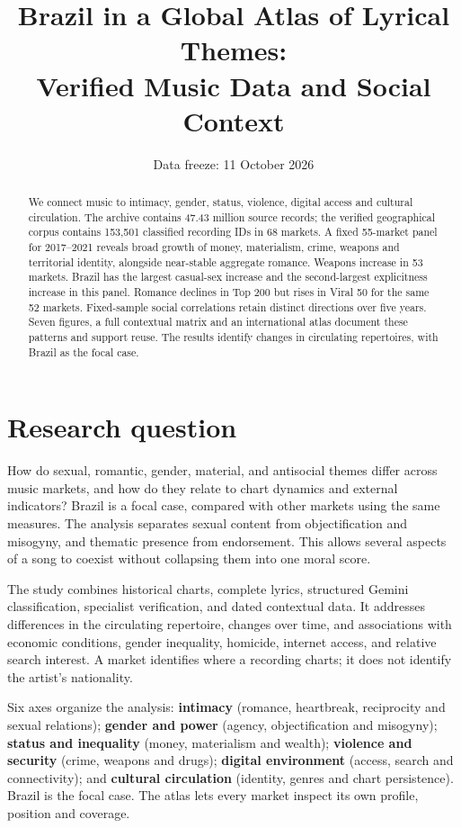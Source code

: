 \documentclass[10pt,a4paper,twocolumn]{article}
\title{\vspace{-8mm}\Large\bfseries Brazil in a Global Atlas of Lyrical Themes:\\Verified Music Data and Social Context}
\author{}
\date{\vspace{-10mm}\small Data freeze: 11 October 2026}
\begin{document}
\raggedbottom
\maketitle
\begin{abstract}
\noindent We connect music to intimacy, gender, status, violence, digital access and cultural circulation. The archive contains 47.43 million source records; the verified geographical corpus contains 153,501 classified recording IDs in 68 markets. A fixed 55-market panel for 2017--2021 reveals broad growth of money, materialism, crime, weapons and territorial identity, alongside near-stable aggregate romance. Weapons increase in 53 markets. Brazil has the largest casual-sex increase and the second-largest explicitness increase in this panel. Romance declines in Top 200 but rises in Viral 50 for the same 52 markets. Fixed-sample social correlations retain distinct directions over five years. Seven figures, a full contextual matrix and an international atlas document these patterns and support reuse. The results identify changes in circulating repertoires, with Brazil as the focal case.
\end{abstract}

\section{Research question}
How do sexual, romantic, gender, material, and antisocial themes differ across music markets, and how do they relate to chart dynamics and external indicators? Brazil is a focal case, compared with other markets using the same measures. The analysis separates sexual content from objectification and misogyny, and thematic presence from endorsement. This allows several aspects of a song to coexist without collapsing them into one moral score.

The study combines historical charts, complete lyrics, structured Gemini classification, specialist verification, and dated contextual data. It addresses differences in the circulating repertoire, changes over time, and associations with economic conditions, gender inequality, homicide, internet access, and relative search interest. A market identifies where a recording charts; it does not identify the artist's nationality.

Six axes organize the analysis: \textbf{intimacy} (romance, heartbreak, reciprocity and sexual relations); \textbf{gender and power} (agency, objectification and misogyny); \textbf{status and inequality} (money, materialism and wealth); \textbf{violence and security} (crime, weapons and drugs); \textbf{digital environment} (access, search and connectivity); and \textbf{cultural circulation} (identity, genres and chart persistence). Brazil is the focal case. The atlas lets every market inspect its own profile, position and coverage.
\end{document}
